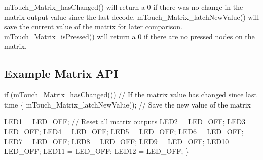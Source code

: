 m\+Touch\+\_\+\+Matrix\+\_\+has\+Changed() will return a \textquotesingle{}0\textquotesingle{} if there was no change in the matrix output value since the last decode. m\+Touch\+\_\+\+Matrix\+\_\+latch\+New\+Value() will save the current value of the matrix for later comparison. m\+Touch\+\_\+\+Matrix\+\_\+is\+Pressed() will return a \textquotesingle{}0\textquotesingle{} if there are no pressed nodes on the matrix.\hypertarget{feat_matrix_featMatrix-API}{}\subsection{Example Matrix A\+P\+I}\label{feat_matrix_featMatrix-API}

\begin{DoxyCode}
\textcolor{keywordflow}{if} (mTouch\_Matrix\_hasChanged())         \textcolor{comment}{// If the matrix value has changed since last time}
\{
    mTouch\_Matrix\_latchNewValue();      \textcolor{comment}{// Save the new value of the matrix}
    
    LED1  = LED\_OFF;                    \textcolor{comment}{// Reset all matrix outputs}
    LED2  = LED\_OFF;
    LED3  = LED\_OFF;
    LED4  = LED\_OFF;
    LED5  = LED\_OFF;
    LED6  = LED\_OFF;
    LED7  = LED\_OFF;
    LED8  = LED\_OFF;
    LED9  = LED\_OFF;
    LED10 = LED\_OFF;
    LED11 = LED\_OFF;
    LED12 = LED\_OFF;
\}


\end{DoxyCode}
